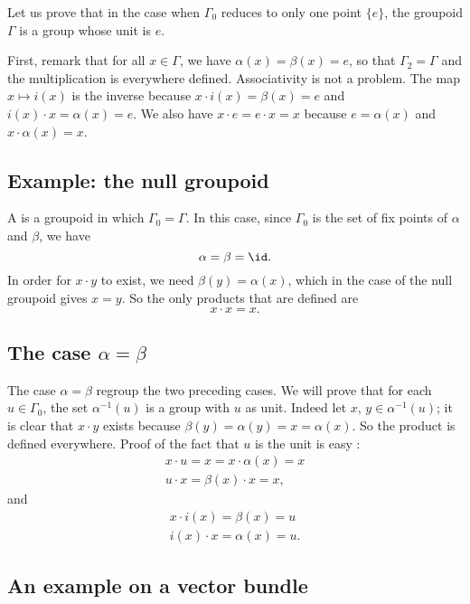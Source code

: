 Let us prove that in the case when $\Gamma_0$ reduces to only one point $\{ e \}$, the groupoid $\Gamma$ is a group whose unit is $e$. 

First, remark that for all $x\in\Gamma$, we have $\alpha(x)=\beta(x)=e$, so that $\Gamma_2=\Gamma$ and the multiplication is everywhere defined. Associativity is not a problem. The map $x\mapsto i(x)$ is the inverse because $x\cdot i(x)=\beta(x)=e$ and $i(x)\cdot x=\alpha(x)=e$. We also have $x\cdot e=e\cdot x=x$ because $e=\alpha(x)$ and $x\cdot \alpha(x)=x$.

\subsection{Example: the null  groupoid}

A  is a groupoid in which $\Gamma_0=\Gamma$. In this case, since $\Gamma_0$ is the set of fix points of $\alpha$ and $\beta$, we have 
\[ 
  \alpha=\beta=\id.
\]
In order for $x\cdot y$ to exist, we need $\beta(y)=\alpha(x)$, which in the case of the null groupoid gives $x=y$. So the only products that are defined are
\[ 
  x\cdot x=x.
\]

\subsection{The case \texorpdfstring{$\alpha=\beta$}{a=b}}

The case $\alpha=\beta$ regroup the two preceding cases. We will prove that for each $u\in\Gamma_0$, the set $\alpha^{-1}(u)$ is a group with $u$ as unit. Indeed let $x$, $y\in\alpha^{-1}(u)$; it is clear that $x\cdot y$ exists because $\beta(y)=\alpha(y)=x=\alpha(x)$. So the product is defined everywhere. Proof of the fact that $u$ is the unit is easy :
\begin{align*}
x\cdot u=x=x\cdot\alpha(x)=x\\
u\cdot x=\beta(x)\cdot x=x,
\end{align*}
and
\begin{align*}
x\cdot i(x)=\beta(x)=u\\
i(x)\cdot x=\alpha(x)=u.
\end{align*}

\subsection{An example on a vector bundle}

